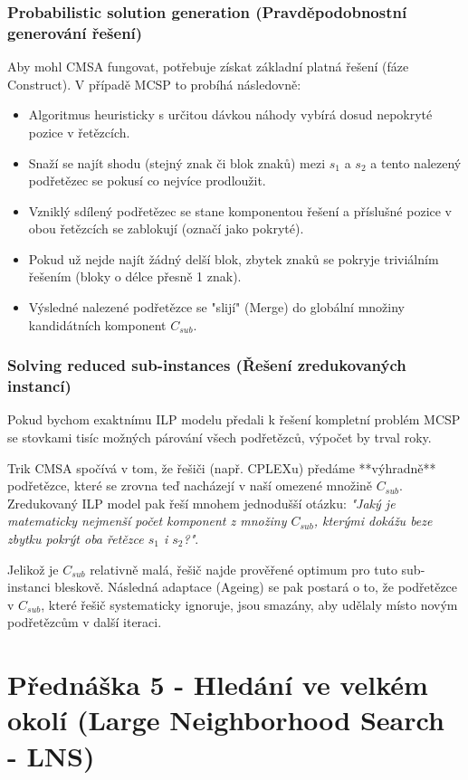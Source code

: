 \documentclass[12pt,a4paper]{article}
\theoremstyle{definition}
\begin{document}
\subsubsection{Probabilistic solution generation (Pravděpodobnostní generování řešení)}
Aby mohl CMSA fungovat, potřebuje získat základní platná řešení (fáze Construct). V případě MCSP to probíhá následovně:
\begin{itemize}
    \item Algoritmus heuristicky s určitou dávkou náhody vybírá dosud nepokryté pozice v řetězcích.
    \item Snaží se najít shodu (stejný znak či blok znaků) mezi $s_1$ a $s_2$ a tento nalezený podřetězec se pokusí co nejvíce prodloužit.
    \item Vzniklý sdílený podřetězec se stane komponentou řešení a příslušné pozice v obou řetězcích se zablokují (označí jako pokryté).
    \item Pokud už nejde najít žádný delší blok, zbytek znaků se pokryje triviálním řešením (bloky o délce přesně 1 znak). 
    \item Výsledné nalezené podřetězce se "slijí" (Merge) do globální množiny kandidátních komponent $C_{sub}$.
\end{itemize}

\subsubsection{Solving reduced sub-instances (Řešení zredukovaných instancí)}
Pokud bychom exaktnímu ILP modelu předali k řešení kompletní problém MCSP se stovkami tisíc možných párování všech podřetězců, výpočet by trval roky. 

Trik CMSA spočívá v tom, že řešiči (např. CPLEXu) předáme **výhradně** podřetězce, které se zrovna teď nacházejí v naší omezené množině $C_{sub}$. Zredukovaný ILP model pak řeší mnohem jednodušší otázku: \textit{"Jaký je matematicky nejmenší počet komponent z množiny $C_{sub}$, kterými dokážu beze zbytku pokrýt oba řetězce $s_1$ i $s_2$?"}. 

Jelikož je $C_{sub}$ relativně malá, řešič najde prověřené optimum pro tuto sub-instanci bleskově. Následná adaptace (Ageing) se pak postará o to, že podřetězce v $C_{sub}$, které řešič systematicky ignoruje, jsou smazány, aby udělaly místo novým podřetězcům v další iteraci.

\section{Přednáška 5 - Hledání ve velkém okolí (Large Neighborhood Search - LNS)}
\end{document}
